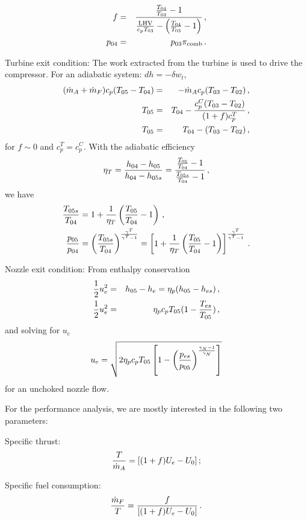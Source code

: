 \begin{itemizePacked}
\begin{eqnarray}
  f &=& {\frac{{\frac{T_{04}}{T_{03}}}-1}{{\frac{\text{LHV}}{c_p T_{03}}}-\left( {\frac{T_{04}}{T_{03}}}-1 \right)}}\,,\\
  p_{04} &=& p_{03} \pi_\text{comb}\,.
\end{eqnarray}
\item Turbine exit condition:
The work extracted from the turbine is used to drive the compressor. For an adiabatic system: $dh = - \delta w_t$,
\begin{eqnarray}
(\dot{m}_A+\dot{m}_F)c_p (T_{05}-T_{04}) &=& -\dot{m}_A c_p (T_{03}-T_{02})\,,\\
T_{05} &=& T_{04} - {\frac{c_p^C (T_{03}-T_{02})}{(1+f) c_p^T}}\,,\\
T_{05} &=& T_{04} - (T_{03}-T_{02})\,,
\end{eqnarray}
for $f \sim 0$ and $c_p^T = c_p^C$.
With the adiabatic efficiency
\begin{equation}
\eta_T = {\frac{h_{04}-h_{05}}{h_{04}-h_{05s}}} = {\frac{{\frac{T_{05}}{T_{04}}}-1}{{\frac{T_{05s}}{T_{04}}}-1}}\,,
\end{equation}
we have
\begin{align}
{\frac{T_{05s}}{T_{04}}} &= 1+{\frac{1}{\eta_T}} \left( \frac{T_{05}}{T_{04}}-1 \right)\,,\\
{\frac{p_{05}}{p_{04}}} &= \left({\frac{T_{05s}}{T_{04}}}\right)^{\frac{\gamma^T}{\gamma^T-1}} = \left[ 1+\frac{1}{\eta_T} \left( {\frac{T_{05}}{T_{04}}}-1 \right) \right]^{\frac{\gamma^T}{\gamma^T-1}}\,. \label{eq:p05_over_p04}
\end{align}
\item Nozzle exit condition: From enthalpy conservation
\begin{eqnarray}
{\frac{1}{2}}u_e^2 &=& h_{05} - h_e = \eta_p(h_{05}-h_{es})\,,\\
{\frac{1}{2}}u_e^2 &=& \eta_p c_p T_{05}(1-{\frac{T_{es}}{T_{05}}})\,,
\end{eqnarray}
and solving for $u_e$
\begin{equation}
u_e = \sqrt{2 \eta_p c_p T_{05}\left[1- \left({\frac{p_{es}}{p_{05}}}\right)^{\frac{\gamma_N-1}{\gamma_N}} \right]}
\end{equation}
for an unchoked nozzle flow.
\end{itemizePacked}

For the performance analysis, we are mostly interested in the following two parameters:
\begin{itemizePacked}
\item Specific thrust:
\begin{equation}
  {\frac{T}{\dot{m}_A}} = [(1+f)U_e - U_0]\,;
\end{equation}
\item Specific fuel consumption:
\begin{equation}
  {\frac{\dot{m}_F}{T}} = {\frac{f}{[(1+f)U_e-U_0]}}\,.
\end{equation}
\end{itemizePacked}


